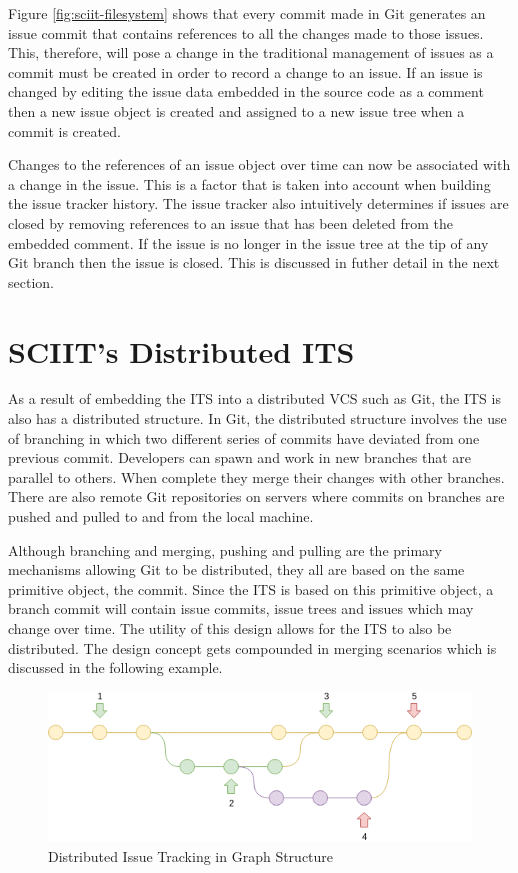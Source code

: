 \documentclass{mproj}
\begin{document}
Figure \ref{fig:sciit-filesystem} shows that every commit made in Git generates an issue commit that contains references to all the changes made to those issues. This, therefore, will pose a change in the traditional management of issues as a commit must be created in order to record a change to an issue. If an issue is changed by editing the issue data embedded in the source code as a comment then a new issue object is created and assigned to a new issue tree when a commit is created. 

Changes to the references of an issue object over time can now be associated with a change in the issue. This is a factor that is taken into account when building the issue tracker history. The issue tracker also intuitively determines if issues are closed by removing references to an issue that has been deleted from the embedded comment. If the issue is no longer in the issue tree at the tip of any Git branch then the issue is closed. This is discussed in futher detail in the next section.

\section{SCIIT's Distributed ITS}

As a result of embedding the ITS into a distributed VCS such as Git, the ITS is also has a distributed structure. In Git, the distributed structure involves the use of branching in which two different series of commits have deviated from one previous commit. Developers can spawn and work in new branches that are parallel to others. When complete they merge their changes with other branches. There are also remote Git repositories on servers where commits on branches are pushed and pulled to and from the local machine.

Although branching and merging, pushing and pulling are the primary mechanisms allowing Git to be distributed, they all are based on the same primitive object, the commit. Since the ITS is based on this primitive object, a branch commit will contain issue commits, issue trees and issues which may change over time. The utility of this design allows for the ITS to also be distributed. The design concept gets compounded in merging scenarios which is discussed in the following example.


\begin{figure}[h!]
\caption{Distributed Issue Tracking in Graph Structure}
\label{fig:distributed-issue-tracking}
\centering
\includegraphics[width=15cm]{distributed-issue-tracking}
\end{figure}
\end{document}
